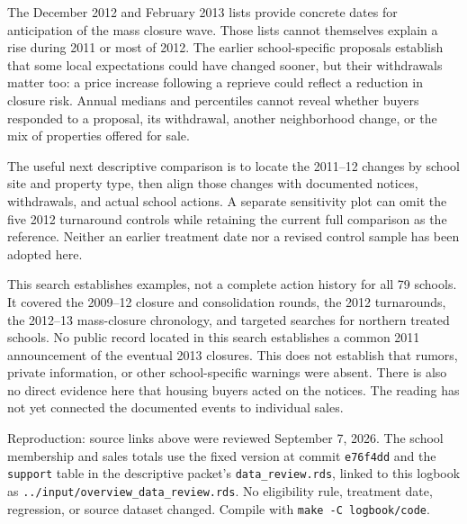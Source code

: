 The December 2012 and February 2013 lists provide concrete dates for anticipation
of the mass closure wave. Those lists cannot themselves explain a rise during
2011 or most of 2012. The earlier school-specific proposals establish that some local
expectations could have changed sooner, but their withdrawals matter too:
a price increase following a reprieve could reflect a reduction in closure
risk. Annual medians and percentiles cannot reveal whether buyers responded
to a proposal, its withdrawal, another neighborhood change, or the mix of
properties offered for sale.

The useful next descriptive comparison is to locate the 2011--12 changes by
school site and property type, then align those changes with documented notices,
withdrawals, and actual school actions. A separate sensitivity plot can omit
the five 2012 turnaround controls while retaining the current full comparison
as the reference. Neither an earlier treatment date nor a revised control
sample has been adopted here.

This search establishes examples, not a complete action history for all 79
schools. It covered the 2009--12 closure and consolidation rounds, the 2012
turnarounds, the 2012--13 mass-closure chronology, and targeted searches for
northern treated schools. No public record located in this search establishes
a common 2011 announcement of the eventual 2013 closures. This does not establish
that rumors, private information, or other school-specific warnings were absent.
There is also no direct evidence here that housing buyers acted on the notices.
The reading has not yet connected the documented events to individual sales.

\small
Reproduction: source links above were reviewed September 7, 2026. The school
membership and sales totals use the fixed version at commit \texttt{e76f4dd}
and the \texttt{support} table in the descriptive packet's
\texttt{data\_review.rds}, linked to this logbook as
\texttt{../input/overview\_data\_review.rds}. No eligibility rule, treatment
date, regression, or source dataset changed. Compile with
\texttt{make -C logbook/code}.
\normalsize
